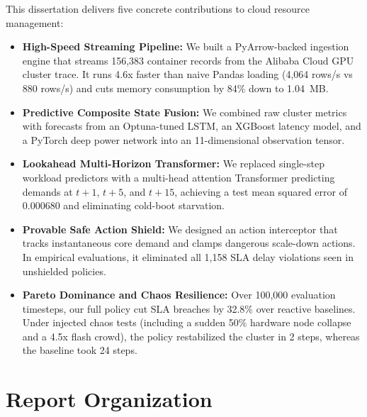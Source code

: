 \documentclass[12pt]{report}
\begin{document}
This dissertation delivers five concrete contributions to cloud resource management:
\begin{itemize}
\item \textbf{High-Speed Streaming Pipeline:} We built a PyArrow-backed ingestion engine that streams 156,383 container records from the Alibaba Cloud GPU cluster trace. It runs 4.6x faster than naive Pandas loading (4,064 rows/s vs 880 rows/s) and cuts memory consumption by 84\% down to 1.04~MB.
\item \textbf{Predictive Composite State Fusion:} We combined raw cluster metrics with forecasts from an Optuna-tuned LSTM, an XGBoost latency model, and a PyTorch deep power network into an 11-dimensional observation tensor.
\item \textbf{Lookahead Multi-Horizon Transformer:} We replaced single-step workload predictors with a multi-head attention Transformer predicting demands at $t+1$, $t+5$, and $t+15$, achieving a test mean squared error of 0.000680 and eliminating cold-boot starvation.
\item \textbf{Provable Safe Action Shield:} We designed an action interceptor that tracks instantaneous core demand and clamps dangerous scale-down actions. In empirical evaluations, it eliminated all 1,158 SLA delay violations seen in unshielded policies.
\item \textbf{Pareto Dominance and Chaos Resilience:} Over 100,000 evaluation timesteps, our full policy cut SLA breaches by 32.8\% over reactive baselines. Under injected chaos tests (including a sudden 50\% hardware node collapse and a 4.5x flash crowd), the policy restabilized the cluster in 2 steps, whereas the baseline took 24 steps.
\end{itemize}

\section{Report Organization}
\end{document}
